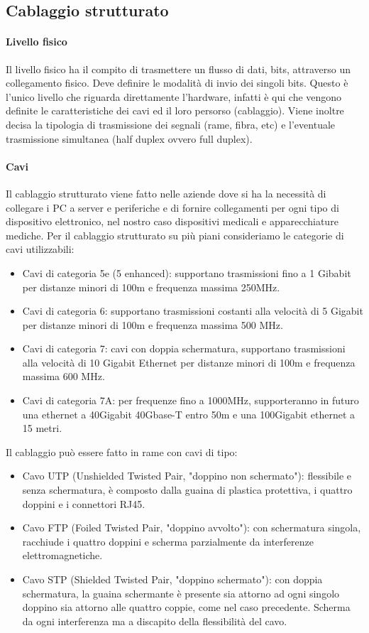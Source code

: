 \subsection{Cablaggio strutturato}

\paragraph{Livello fisico}
Il livello fisico ha il compito di trasmettere un flusso di dati, bits, attraverso un collegamento fisico. Deve definire le modalità di invio dei singoli bits. 
Questo è l'unico livello che riguarda direttamente l'hardware, infatti è qui che vengono definite le caratteristiche dei cavi ed il loro persorso (cablaggio). Viene inoltre decisa la tipologia di trasmissione dei segnali (rame, fibra, etc) e l'eventuale trasmissione simultanea (half duplex ovvero full duplex).

\paragraph{Cavi}
Il cablaggio strutturato viene fatto nelle aziende dove si ha la necessità di collegare i PC a server e periferiche e di fornire collegamenti per ogni tipo di dispositivo elettronico, nel nostro caso dispositivi medicali e apparecchiature mediche.
Per il cablaggio strutturato su più piani consideriamo le categorie di cavi utilizzabili:
\begin{itemize}
    \item Cavi di categoria 5e (5 enhanced): supportano trasmissioni fino a 1 Gibabit per distanze minori di 100m e frequenza massima 250MHz.
    \item Cavi di categoria 6: supportano trasmissioni costanti alla velocità di 5 Gigabit per distanze minori di 100m e frequenza massima 500 MHz.
    \item Cavi di categoria 7: cavi con doppia schermatura, supportano trasmissioni alla velocità di 10 Gigabit Ethernet per distanze minori di 100m e frequenza massima 600 MHz. 
    \item Cavi di categoria 7A: per frequenze fino a 1000MHz, supporteranno in futuro una ethernet a 40Gigabit 40Gbase-T entro 50m e una 100Gigabit ethernet a 15 metri. 
\end{itemize}

Il cablaggio può essere fatto in rame con cavi di tipo:
\begin{itemize}
  \item Cavo UTP (Unshielded Twisted Pair, "doppino non schermato"): flessibile e senza schermatura, è composto dalla guaina di plastica protettiva, i quattro doppini e i connettori RJ45.
  \item Cavo FTP (Foiled Twisted Pair, "doppino avvolto"): con schermatura singola, racchiude i quattro doppini e scherma parzialmente da interferenze elettromagnetiche. 
  \item Cavo STP (Shielded Twisted Pair, "doppino schermato"): con doppia schermatura, la guaina schermante è presente sia attorno ad ogni singolo doppino sia attorno alle quattro coppie, come nel caso precedente. Scherma da ogni interferenza ma a discapito della flessibilità del cavo.
\end{itemize}

